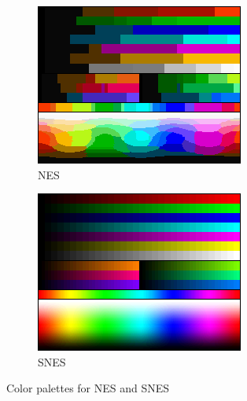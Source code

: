 \documentclass[10pt,twocolumn,letterpaper]{article}
\begin{document}
\begin{figure}[htp]
	\centering
	\begin{subfigure}[b]{0.4\textwidth}
		\includegraphics[width=\textwidth]{figures/NES_palette_color_test_chart.png}
		\caption{NES}
		\label{fig:nes}
	\end{subfigure}
	\begin{subfigure}[b]{0.4\textwidth}
		\includegraphics[width=\textwidth]{figures/SNES_palette_color_test_chart.png}
		\caption{SNES}
		\label{fig:snes}
	\end{subfigure}
	\caption{Color palettes for NES and SNES}
\end{figure}
\end{document}
